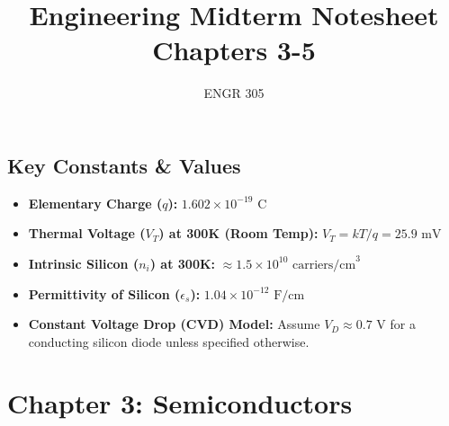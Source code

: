 \documentclass[12pt, letterpaper]{article}
\title{Engineering Midterm Notesheet\\Chapters 3-5}
\author{ENGR 305}
\date{} %
\begin{document}
\maketitle
\thispagestyle{empty}

\subsection*{Key Constants \& Values}
\begin{itemize}
    \item \textbf{Elementary Charge ($q$):} $1.602 \times 10^{-19} \text{ C}$
    \item \textbf{Thermal Voltage ($V_T$) at 300K (Room Temp):} $V_T = kT/q = 25.9 \text{ mV}$
    \item \textbf{Intrinsic Silicon ($n_i$) at 300K:} $\approx 1.5 \times 10^{10} \text{ carriers/cm}^3$ 
    \item \textbf{Permittivity of Silicon ($\epsilon_s$):} $1.04 \times 10^{-12} \text{ F/cm}$
    \item \textbf{Constant Voltage Drop (CVD) Model:} Assume $V_D \approx 0.7 \text{ V}$ for a conducting silicon diode unless specified otherwise.
\end{itemize}

\hrulefill

\section*{Chapter 3: Semiconductors}
\end{document}
